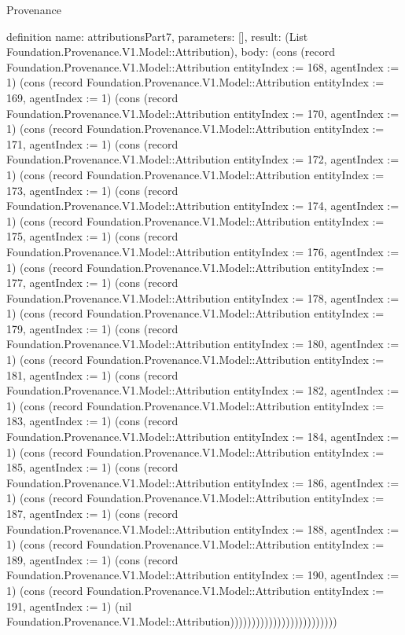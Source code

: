 \begin{lexlean}{Provenance}
\begin{semanticmodule}
definition{
  name: attributionsPart7,
  parameters: [],
  result: (List Foundation.Provenance.V1.Model::Attribution),
  body: (cons (record Foundation.Provenance.V1.Model::Attribution {entityIndex := 168, agentIndex := 1}) (cons (record Foundation.Provenance.V1.Model::Attribution {entityIndex := 169, agentIndex := 1}) (cons (record Foundation.Provenance.V1.Model::Attribution {entityIndex := 170, agentIndex := 1}) (cons (record Foundation.Provenance.V1.Model::Attribution {entityIndex := 171, agentIndex := 1}) (cons (record Foundation.Provenance.V1.Model::Attribution {entityIndex := 172, agentIndex := 1}) (cons (record Foundation.Provenance.V1.Model::Attribution {entityIndex := 173, agentIndex := 1}) (cons (record Foundation.Provenance.V1.Model::Attribution {entityIndex := 174, agentIndex := 1}) (cons (record Foundation.Provenance.V1.Model::Attribution {entityIndex := 175, agentIndex := 1}) (cons (record Foundation.Provenance.V1.Model::Attribution {entityIndex := 176, agentIndex := 1}) (cons (record Foundation.Provenance.V1.Model::Attribution {entityIndex := 177, agentIndex := 1}) (cons (record Foundation.Provenance.V1.Model::Attribution {entityIndex := 178, agentIndex := 1}) (cons (record Foundation.Provenance.V1.Model::Attribution {entityIndex := 179, agentIndex := 1}) (cons (record Foundation.Provenance.V1.Model::Attribution {entityIndex := 180, agentIndex := 1}) (cons (record Foundation.Provenance.V1.Model::Attribution {entityIndex := 181, agentIndex := 1}) (cons (record Foundation.Provenance.V1.Model::Attribution {entityIndex := 182, agentIndex := 1}) (cons (record Foundation.Provenance.V1.Model::Attribution {entityIndex := 183, agentIndex := 1}) (cons (record Foundation.Provenance.V1.Model::Attribution {entityIndex := 184, agentIndex := 1}) (cons (record Foundation.Provenance.V1.Model::Attribution {entityIndex := 185, agentIndex := 1}) (cons (record Foundation.Provenance.V1.Model::Attribution {entityIndex := 186, agentIndex := 1}) (cons (record Foundation.Provenance.V1.Model::Attribution {entityIndex := 187, agentIndex := 1}) (cons (record Foundation.Provenance.V1.Model::Attribution {entityIndex := 188, agentIndex := 1}) (cons (record Foundation.Provenance.V1.Model::Attribution {entityIndex := 189, agentIndex := 1}) (cons (record Foundation.Provenance.V1.Model::Attribution {entityIndex := 190, agentIndex := 1}) (cons (record Foundation.Provenance.V1.Model::Attribution {entityIndex := 191, agentIndex := 1}) (nil Foundation.Provenance.V1.Model::Attribution)))))))))))))))))))))))))
}


\end{semanticmodule}
\end{lexlean}
